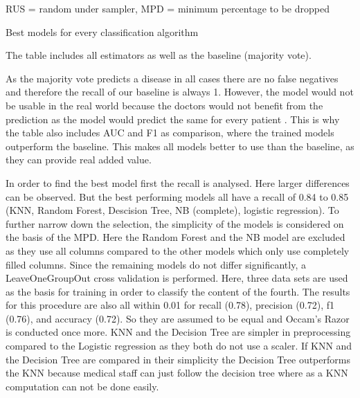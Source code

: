 \begin{table}[]
\begin{footnotesize}
		\begin{center}
			\centering
			RUS = random under sampler, MPD = minimum percentage to be dropped
		\end{center}
	\end{footnotesize}
	\caption{Best models for every classification algorithm}
	\label{table:modelresults}

\end{table}

The table includes all estimators as well as the baseline (majority vote). 

As the majority vote predicts a disease in all cases there are no false negatives and therefore the recall of our baseline is always 1. However, the model would not be usable in the real world because the doctors would not benefit from the prediction as the model would predict the same for every patient . This is why the table also includes AUC and F1 as comparison, where the trained models outperform the baseline. This makes all models better to use than the baseline, as they can provide real added value. 

In order to find the best model first the recall is analysed. Here larger differences can be observed. But the best performing models all have a recall of 0.84 to 0.85 (KNN, Random Forest, Descision Tree, NB (complete), logistic regression).  To further narrow down the selection, the simplicity of the models is considered on the basis of the MPD. Here the Random Forest and the NB model are excluded as they use all columns compared to the other models which only use completely filled columns. Since the remaining models do not differ significantly, a LeaveOneGroupOut cross validation is performed. Here, three data sets are used as the basis for training in order to classify the content of the fourth. The results for this procedure are also all within 0.01 for recall (0.78), precision (0.72), f1 (0.76), and accuracy (0.72). So they are assumed to be equal and Occam's Razor is conducted once more. KNN and the Decision Tree are simpler in preprocessing compared to the Logistic regression as they both do not use a scaler. If KNN and the Decision Tree are compared in their simplicity the Decision Tree outperforms the KNN because medical staff can just follow the decision tree where as a KNN computation can not be done easily. 

